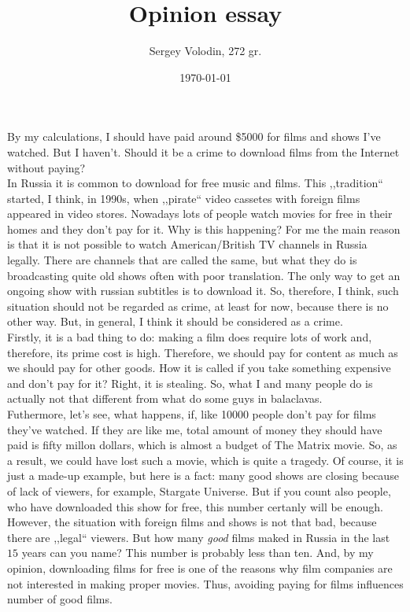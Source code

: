 \documentclass[a4paper]{article}
\title{Opinion essay}
\date{\today}
\author{Sergey Volodin, 272 gr.}
\begin{document}
\maketitle
By my calculations, I should have paid around \$5000 for films and shows I've watched. But I haven't. Should it be a crime to download films from the Internet without paying?
\\[5pt]
In Russia it is common to download for free music and films. This ,,tradition`` started, I think, in 1990s, when ,,pirate`` video cassetes with foreign films appeared in video stores. Nowadays lots of people watch movies for free in their homes and they don't pay for it. Why is this happening? For me the main reason is that it is not possible to watch American/British TV channels in Russia legally. There are channels that are called the same, but what they do is broadcasting quite old shows often with poor translation. The only way to get an ongoing show with russian subtitles is to download it. So, therefore, I think, such situation should not be regarded as crime, at least for now, because there is no other way. But, in general, I think it should be considered as a crime.
\\[5pt]
Firstly, it is a bad thing to do: making a film does require lots of work and, therefore, its prime cost is high. Therefore, we should pay for content as much as we should pay for other goods. How it is called if you take something expensive and don't pay for it? Right, it is stealing. So, what I and many people do is actually not that different from what do some guys in balaclavas.
\\[5pt]
Futhermore, let's see, what happens, if, like 10000 people don't pay for films they've watched. If they are like me, total amount of money they should have paid is fifty millon dollars, which is almost a budget of The Matrix movie. So, as a result, we could have lost such a movie, which is quite a tragedy. Of course, it is just a made-up example, but here is a fact: many good shows are closing because of lack of viewers, for example, Stargate Universe. But if you count also people, who have downloaded this show for free, this number certanly will be enough.
\\[5pt]
However, the situation with foreign films and shows is not that bad, because there are ,,legal`` viewers. But how many {\em{good}} films maked in Russia in the last $15$ years can you name? This number is probably less than ten. And, by my opinion, downloading films for free is one of the reasons why film companies are not interested in making proper movies. Thus, avoiding paying for films influences number of good films.
\end{document}
